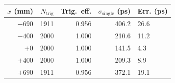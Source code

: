 \begin{tabular}{rrrrl}\toprule
$x$ (mm) & $N_\mathrm{trig}$ & Trig.~eff. & $\sigma_\mathrm{single}$ (ps) & Err. (ps) \\
\midrule
$-690$ & 1911 & 0.956 & 406.2 & 26.6 \\
$-400$ & 2000 & 1.000 & 210.6 & 11.2 \\
$+0$ & 2000 & 1.000 & 141.5 & 4.3 \\
$+400$ & 2000 & 1.000 & 209.3 & 8.9 \\
$+690$ & 1911 & 0.956 & 372.1 & 19.1 \\
\bottomrule\end{tabular}
